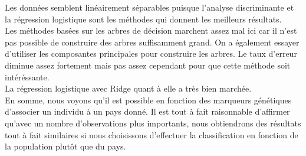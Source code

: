 \documentclass[12pt,a4paper]{article}
\begin{document}
Les données semblent linéairement séparables puisque l'analyse discriminante et
la régression logistique sont les méthodes qui donnent les meilleurs
résultats.\\

Les méthodes basées sur les arbres de décision marchent assez mal ici car il
n'est pas possible de construire des arbres suffisamment grand. On a
également essayer d'utiliser les composantes principales pour construire les
arbres. Le taux d'erreur diminue assez fortement mais pas assez cependant
pour que cette méthode soit intéréssante. \\
La régression logistique avec Ridge quant à elle a très bien marchée.
\vspace{3mm}\\

En somme, nous voyons qu'il est possible en fonction des marqueurs génétiques
d'associer un individu à un pays donné. Il est tout à fait raisonnable
d'affirmer qu'avec un nombre d'observations plus importants, nous obtiendrons
des résultats tout à fait similaires si nous choisissons d'effectuer la
classification en fonction de la population plutôt que du pays.
\end{document}
